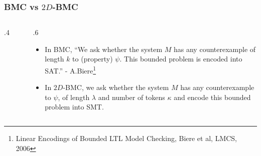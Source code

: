 \documentclass [serif,professionalfont]{beamer}
\begin{document}
\begin{frame}
    \frametitle{BMC vs $2D$-BMC}

    \begin{columns}[T] %
        \begin{column}{.4\textwidth}
            \begin{figure}
                \begin{center}
                    \scalebox{0.5}{}
                \end{center}
            \end{figure}
        \end{column}%
        \hfill%
        \begin{column}{.6\textwidth}
            \begin{itemize}
                \item In BMC, ``We ask whether the system $M$ has any counterexample of length $k$ to (property) $\psi$. This bounded problem is encoded into SAT.'' - A.Biere\footnote{Linear Encodings of Bounded LTL Model Checking, Biere et al, LMCS, 2006}
                \item In $2D$-BMC, we ask whether the system $M$ has any counterexample to $\psi$, of length $\lambda$ and number of tokens $\kappa$  and encode this bounded problem into SMT.
            \end{itemize}
        \end{column}%
    \end{columns}
\end{frame}
\end{document}
